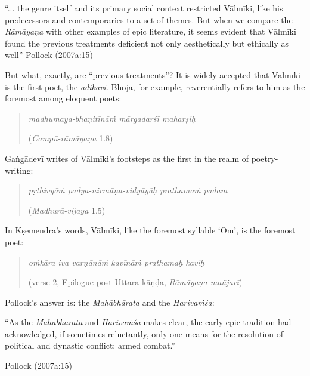 \begin{myquote}
“... the genre itself and its primary social context restricted Vālmīki, like his predecessors and contemporaries to a set of themes. But when we compare the {\sl Rāmāyaṇa} with other examples of epic literature, it seems evident that Vālmīki found the previous treatments deficient not only aesthetically but ethically as well”
\hfill Pollock (2007a:15)
\end{myquote}

But what, exactly, are “previous treatments”? It is widely accepted that Vālmīki is the first poet, the {\sl ādikavi}. Bhoja, for example, reverentially refers to him as the foremost among eloquent poets:

\begin{quote}
{\sl madhumaya-bhaṇitīnāṁ mārgadarśī maharṣiḥ} 
\vskip -3pt

\hfill ({\sl Campū-rāmāyaṇa} 1.8)
\end{quote}

Gaṅgādevī writes of Vālmīki’s footsteps as the first in the realm of poetry-writing:   

\begin{quote}
{\sl pṛthivyāṁ padya-nirmāṇa-vidyāyāḥ prathamaṁ padam} 
\vskip -3pt

\hfill ({\sl Madhurā-vijaya} 1.5) 
\end{quote}

In Kṣemendra’s words, Vālmīki, like the foremost syllable ‘Om’, is the foremost poet:

\begin{quote}
{\sl oṁkāra iva varṇānāṁ kavīnāṁ prathamaḥ kaviḥ}
\vskip -3pt

\hfill (verse 2, Epilogue post Uttara-kāṇḍa, {\sl Rāmāyaṇa-mañjarī})
\end{quote}

Pollock’s answer is: the {\sl Mahābhārata} and the {\sl Harivaṁśa}:

\begin{myquote}
“As the {\sl Mahābhārata} and {\sl Harivaṁśa} makes clear, the early epic tradition had acknowledged, if sometimes reluctantly, only one means for the resolution of political and dynastic conflict: armed combat.”

\hfill Pollock (2007a:15)
\end{myquote}

